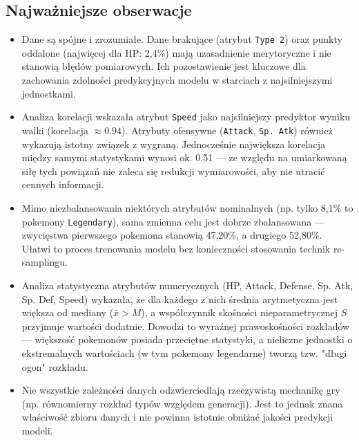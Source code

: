 \documentclass[12pt, a4paper]{report}
\begin{document}
\subsection{Najważniejsze obserwacje}
\begin{itemize}
    \item Dane są spójne i zrozumiałe. Dane brakujące (atrybut \texttt{Type 2}) oraz punkty oddalone (najwięcej dla HP: 2,4\%) mają uzasadnienie merytoryczne i nie stanowią błędów pomiarowych. Ich pozostawienie jest kluczowe dla zachowania zdolności predykcyjnych modelu w starciach z najsilniejszymi jednostkami.
    \item Analiza korelacji wskazała atrybut \texttt{Speed} jako najsilniejszy predyktor wyniku walki (korelacja $\approx 0.94$). Atrybuty ofensywne (\texttt{Attack}, \texttt{Sp. Atk}) również wykazują istotny związek z wygraną. Jednocześnie największa korelacja między samymi statystykami wynosi ok. 0.51 — ze względu na umiarkowaną siłę tych powiązań nie zaleca się redukcji wymiarowości, aby nie utracić cennych informacji.
    \item Mimo niezbalansowania niektórych atrybutów nominalnych (np. tylko 8,1\% to pokemony \texttt{Legendary}), sama zmienna celu jest dobrze zbalansowana — zwycięstwa pierwszego pokemona stanowią 47,20\%, a drugiego 52,80\%. Ułatwi to proces trenowania modelu bez konieczności stosowania technik re-samplingu.


    
    \item Analiza statystyczna atrybutów numerycznych (HP, Attack, Defense, Sp. Atk, Sp. Def, Speed) wykazała, że dla każdego z nich średnia arytmetyczna jest większa od mediany ($\bar{x} > M$), a współczynnik skośności nieparametrycznej $S$ przyjmuje wartości dodatnie. Dowodzi to wyraźnej prawoskośności rozkładów — większość pokemonów posiada przeciętne statystyki, a nieliczne jednostki o ekstremalnych wartościach (w tym pokemony legendarne) tworzą tzw. "długi ogon" rozkładu.
    
    \item Nie wszystkie zależności danych odzwierciedlają rzeczywistą mechanikę gry (np. równomierny rozkład typów względem generacji). Jest to jednak znana właściwość zbioru danych i nie powinna istotnie obniżać jakości predykcji modeli.
    
\end{itemize}
\end{document}
